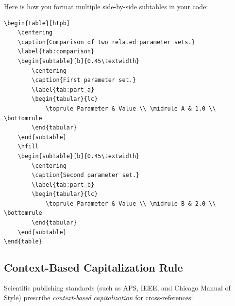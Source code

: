 Here is how you format multiple side-by-side subtables in your code:
\begin{verbatim}
\begin{table}[htpb]
    \centering
    \caption{Comparison of two related parameter sets.}
    \label{tab:comparison}
    \begin{subtable}[b]{0.45\textwidth}
        \centering
        \caption{First parameter set.}
        \label{tab:part_a}
        \begin{tabular}{lc}
            \toprule Parameter & Value \\ \midrule A & 1.0 \\ \bottomrule
        \end{tabular}
    \end{subtable}
    \hfill
    \begin{subtable}[b]{0.45\textwidth}
        \centering
        \caption{Second parameter set.}
        \label{tab:part_b}
        \begin{tabular}{lc}
            \toprule Parameter & Value \\ \midrule B & 2.0 \\ \bottomrule
        \end{tabular}
    \end{subtable}
\end{table}
\end{verbatim}

\subsection{Context-Based Capitalization Rule}
\label{sec:cref_capitalization}
Scientific publishing standards (such as APS, IEEE, and Chicago Manual of Style) prescribe \emph{context-based capitalization} for cross-references:

